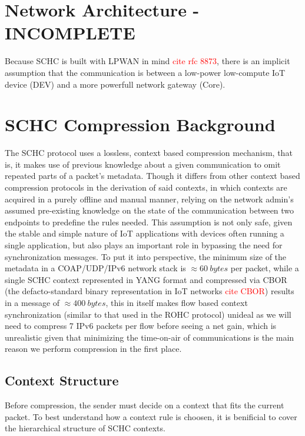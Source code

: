 \documentclass[12pt]{dalthesis}
\begin{document}
\chapter{Network Architecture - INCOMPLETE}
	\par{
		Because SCHC is built with LPWAN in mind \textcolor{red}{cite rfc 8873}, there is an implicit assumption that the communication is between
		a low-power low-compute IoT device (DEV) and a more powerfull network gateway (Core).
	}
\chapter{SCHC Compression  Background}
	

	\par{
		The SCHC protocol uses a lossless, context based compression mechanism, that is, it makes use of previous knowledge
		about a given communication to omit repeated parts of a packet's metadata. Though it
		differs from other context based compression protocols in the derivation of said contexts,
		in which contexts are acquired in a purely offline and manual manner, relying on the network admin's assumed
		pre-existing knowledge on the state of the communication between two endpoints to predefine the rules needed.
		This assumption is not only safe, given the stable and simple nature of IoT applications with devices often running a single application, but
		also plays an important role in bypassing the need for synchronization messages. To put it into perspective, the minimum size of the metadata in a 
		COAP/UDP/IPv6 network stack is $\approx 60 \ bytes$ per packet, while a single SCHC context represented in YANG format and compressed via CBOR 
		(the defacto-standard binary representation in IoT networks \textcolor{red}{cite CBOR}) results in 
		a message of $\approx 400 \ bytes$, this in itself makes flow based context synchronization (similar to that used in the ROHC protocol) unideal as we will need to compress
		7 IPv6 packets per flow before seeing a net gain, which is unrealistic given that minimizing the time-on-air of communications is 
		the main reason we perform compression in the first place.
	}

	\newpage
\section{Context Structure}
	\par{
		Before compression, the sender must decide on a context that fits the current packet.
		To best understand how a context rule is choosen, it is benificial to cover the hierarchical structure of SCHC contexts.
	}
\end{document}

